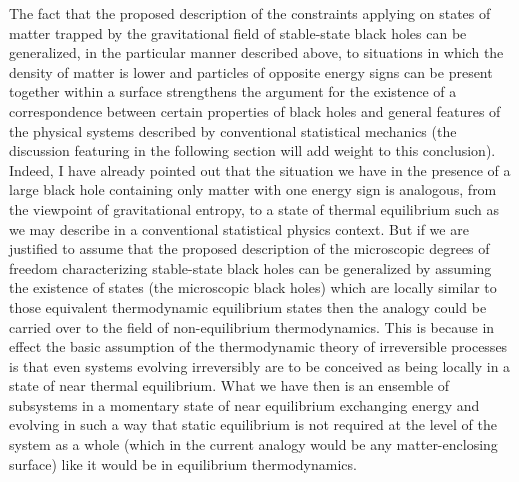 \documentclass[notitlepage,12pt]{report}
\begin{document}
The fact that the proposed description of the constraints applying on states of matter trapped by the gravitational field of stable-state black holes can be generalized, in the particular manner described above, to situations in which the density of matter is lower and particles of opposite energy signs can be present together within a surface strengthens the argument for the existence of a correspondence between certain properties of black holes and general features of the physical systems described by conventional statistical mechanics (the discussion featuring in the following section will add weight to this conclusion). Indeed, I have already pointed out that the situation we have in the presence of a large black hole containing only matter with one energy sign is analogous, from the viewpoint of gravitational entropy, to a state of thermal equilibrium such as we may describe in a conventional statistical physics context. But if we are justified to assume that the proposed description of the microscopic degrees of freedom characterizing stable-state black holes can be generalized by assuming the existence of states (the microscopic black holes) which are locally similar to those equivalent thermodynamic equilibrium states then the analogy could be carried over to the field of non-equilibrium thermodynamics. This is because in effect the basic assumption of the thermodynamic theory of irreversible processes is that even systems evolving irreversibly are to be conceived as being locally in a state of near thermal equilibrium. What we have then is an ensemble of subsystems in a momentary state of near equilibrium exchanging energy and evolving in such a way that static equilibrium is not required at the level of the system as a whole (which in the current analogy would be any matter-enclosing surface) like it would be in equilibrium thermodynamics.
\end{document}
